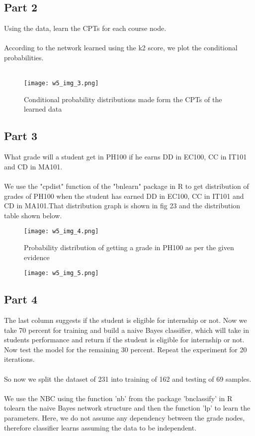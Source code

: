 \documentclass[conference]{IEEEtran}
\begin{document}
\subsection{Part 2}
Using the data, learn the CPTs for each course node.
\\
\\
According to the network learned using the k2 score, we
plot the conditional probabilities.
\\
\\

\begin{figure}[htbp]
\centerline{\texttt{[image: w5\_img\_3.png]}}
\caption{Conditional probability distributions made form the
CPTs of the learned data}
\label{fig}
\end{figure}

\subsection{Part 3}
What grade will a student get in PH100 if he earns DD in
EC100, CC in IT101 and CD in MA101.
\\
\\
We use the "cpdist" function of the "bnlearn" package in R to get distribution of grades of PH100 when the student has earned DD in EC100, CC in IT101 and CD in MA101.That distribution graph is shown in fig 23 and the distribution table shown below.

\begin{figure}[htbp]
\centerline{\texttt{[image: w5\_img\_4.png]}}
\caption{Probability distribution of getting a grade in PH100
as per the given evidence}
\label{fig}
\end{figure}

\begin{figure}[htbp]
\centerline{\texttt{[image: w5\_img\_5.png]}}

\label{fig}
\end{figure}


\subsection{Part 4}
The last column suggests if the student is eligible for internship or not.
Now we take 70 percent for training and build a naive Bayes classifier, which will take in students performance and return if the student is eligible for internship or not. Now test the model for the remaining 30 percent. Repeat the experiment for 20 iterations.
\\
\\
So now we split the dataset of 231 into training of 162 and testing of 69 samples.
\\
\\
We use the NBC using the function 'nb' from the package 'bnclassify' in R tolearn the naive Bayes network structure and then the function ’lp’ to learn the parameters. Here, we do not assume any dependency between
the grade nodes, therefore classifier learns assuming the data to be independent.
\end{document}
